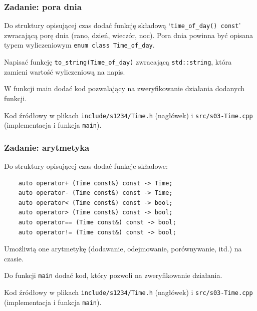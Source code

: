 \documentclass[aspectratio=169,10pt]{beamer}
\begin{document}
\begin{frame}
    \frametitle{Zadanie: pora dnia}
    \label{lecture_exercise_2}

    Do struktury opisującej czas dodać funkcję składową
    `{\tt time\_of\_day() const}' zwracającą porę dnia (rano, dzień, wieczór,
    noc). Pora dnia powinna być opisana typem wyliczeniowym {\tt enum class
    Time\_of\_day}.

    Napisać funkcję \texttt{to\_string(Time\_of\_day)} zwracającą
    \texttt{std::string}, która zamieni wartość wyliczeniową na napis.

    W funkcji main dodać kod pozwalający na zweryfikowanie działania dodanych
    funkcji.

    \vspace{1em}

    {\footnotesize
    Kod źródłowy w plikach {\tt include/s1234/Time.h} (nagłówek) i
    {\tt src/s03-Time.cpp} (implementacja i funkcja {\tt main}).}
\end{frame}

\begin{frame}[fragile]
    \frametitle{Zadanie: arytmetyka}
    \label{lecture_exercise_3}

    Do struktury opisującej czas dodać funkcje składowe:

    {\scriptsize
    \begin{lstlisting}
    auto operator+ (Time const&) const -> Time;
    auto operator- (Time const&) const -> Time;
    auto operator< (Time const&) const -> bool;
    auto operator> (Time const&) const -> bool;
    auto operator== (Time const&) const -> bool;
    auto operator!= (Time const&) const -> bool;
    \end{lstlisting}}

    Umożliwią one arytmetykę (dodawanie, odejmowanie, porównywanie, itd.) na czasie.

    Do funkcji \texttt{main} dodać kod, który pozwoli na zweryfikowanie
    działania.

    \vspace{1em}

    {\footnotesize
    Kod źródłowy w plikach {\tt include/s1234/Time.h} (nagłówek) i
    {\tt src/s03-Time.cpp} (implementacja i funkcja {\tt main}).}
\end{frame}
\end{document}

